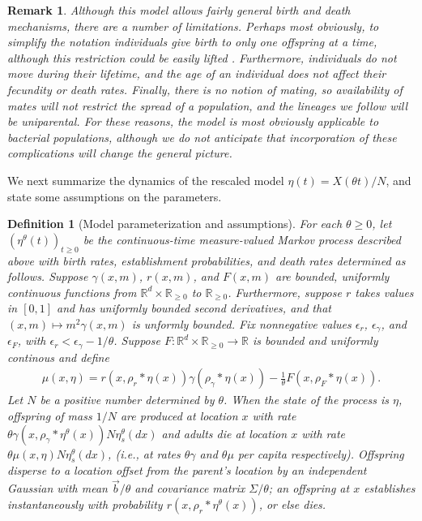 \documentclass[12pt]{article}
\newtheorem{remark}[theorem]{Remark}
\newtheorem{definition}[theorem]{Definition}
\newcommand{\IR}{\mathbb R}
\newcommand{\meanq}{\vec b}    %
\newcommand{\covq}{\Sigma}     %
\newcommand{\kernel}{\rho}  %
\newcommand{\smooth}[1]{\kernel_{#1} \! * \!}  %
\begin{document}
\begin{remark}
Although this model allows fairly general birth and death mechanisms,
there are a number of limitations.
Perhaps most obviously, to simplify the notation
individuals give birth to only one offspring at a time,
although this restriction could be easily lifted
\citep[as in][]{etheridge/kurtz:2018}.
Furthermore, individuals do not move during their lifetime,
and the age of an individual does not affect their fecundity or death rates.
Finally, there is no notion of mating,
so availability of mates will not restrict the spread of a population,
and the lineages we follow will be uniparental.
For these reasons, the model is most obviously applicable to bacterial populations,
although we do not anticipate that incorporation of these complications
will change the general picture.
\end{remark}

We next summarize the dynamics of the rescaled model $\eta(t) = X(\theta t)/N$,
and state some assumptions on the parameters.

\begin{definition}[Model parameterization and assumptions]
    \label{def:model_setup}
    For each $\theta \ge 0$,
    let $\left(\eta^\theta(t)\right)_{t \ge 0}$
    be the continuous-time measure-valued Markov process described above
    with birth rates, establishment probabilities, and death rates
    determined as follows.
    Suppose $\gamma(x, m)$, $r(x, m)$, and $F(x, m)$
    are bounded, uniformly continuous functions
    from $\IR^d \times \IR_{\ge 0}$ to $\IR_{\ge 0}$.
    Furthermore, suppose $r$ takes values in $[0, 1]$
    and has uniformly bounded second derivatives,
    and that $(x, m) \mapsto m^2 \gamma(x, m)$ is unformly bounded.
    Fix nonnegative values $\epsilon_r$, $\epsilon_\gamma$, and $\epsilon_F$,
    with $\epsilon_r < \epsilon_\gamma - 1/\theta$.
    Suppose $F: \IR^d \times \IR_{\ge 0} \to \IR$ is bounded and uniformly continous
    and define
    \begin{align} \label{eqn:mu_defn}
        \mu(x, \eta)
        =
        r(x, \smooth{r} \eta(x))
        \gamma(\smooth{\gamma} \eta(x))
        - \frac{1}{\theta}
        F(x, \smooth{F} \eta(x)) .
    \end{align}
    Let $N$ be a positive number determined by $\theta$.
    When the state of the process is $\eta$,
    offspring of mass $1/N$ are produced at location $x$
    with rate $\theta \gamma(x, \smooth{\gamma} \eta^{\theta}(x)) N \eta^{\theta}_s(dx)$
    and adults die at location $x$ with rate $\theta \mu(x, \eta) N \eta^{\theta}_s(dx)$,
    (i.e., at rates $\theta \gamma$ and $\theta \mu$ per capita respectively).
    Offspring disperse to a location offset from the parent's location
    by an independent Gaussian with mean $\meanq/\theta$
    and covariance matrix $\covq / \theta$;
    an offspring at $x$ establishes instantaneously
    with probability $r(x, \smooth{r} \eta^{\theta}(x))$, or else dies.
\end{definition}
\end{document}

